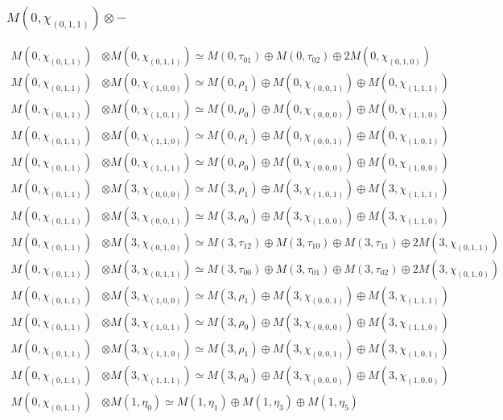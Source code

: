 \subsubsection{$ M(0,\chi_{(0,1,1)})\otimes -$}
\begin{align*}
M(0,\chi_{(0,1,1)}) &\otimes M(0,\chi_{(0,1,1)}) \simeq M(0,\tau_{01}) \oplus M(0,\tau_{02}) \oplus 2 M(0,\chi_{(0,1,0)}) \\
M(0,\chi_{(0,1,1)}) &\otimes M(0,\chi_{(1,0,0)}) \simeq M(0,\rho_{1}) \oplus M(0,\chi_{(0,0,1)}) \oplus M(0,\chi_{(1,1,1)}) \\
M(0,\chi_{(0,1,1)}) &\otimes M(0,\chi_{(1,0,1)}) \simeq M(0,\rho_{0}) \oplus M(0,\chi_{(0,0,0)}) \oplus M(0,\chi_{(1,1,0)}) \\
M(0,\chi_{(0,1,1)}) &\otimes M(0,\chi_{(1,1,0)}) \simeq M(0,\rho_{1}) \oplus M(0,\chi_{(0,0,1)}) \oplus M(0,\chi_{(1,0,1)}) \\
M(0,\chi_{(0,1,1)}) &\otimes M(0,\chi_{(1,1,1)}) \simeq M(0,\rho_{0}) \oplus M(0,\chi_{(0,0,0)}) \oplus M(0,\chi_{(1,0,0)}) \\
M(0,\chi_{(0,1,1)}) &\otimes M(3,\chi_{(0,0,0)}) \simeq M(3,\rho_{1}) \oplus M(3,\chi_{(1,0,1)}) \oplus M(3,\chi_{(1,1,1)}) \\
M(0,\chi_{(0,1,1)}) &\otimes M(3,\chi_{(0,0,1)}) \simeq M(3,\rho_{0}) \oplus M(3,\chi_{(1,0,0)}) \oplus M(3,\chi_{(1,1,0)}) \\
M(0,\chi_{(0,1,1)}) &\otimes M(3,\chi_{(0,1,0)}) \simeq M(3,\tau_{12}) \oplus M(3,\tau_{10}) \oplus M(3,\tau_{11}) \oplus 2 M(3,\chi_{(0,1,1)}) \\
M(0,\chi_{(0,1,1)}) &\otimes M(3,\chi_{(0,1,1)}) \simeq M(3,\tau_{00}) \oplus M(3,\tau_{01}) \oplus M(3,\tau_{02}) \oplus 2 M(3,\chi_{(0,1,0)}) \\
M(0,\chi_{(0,1,1)}) &\otimes M(3,\chi_{(1,0,0)}) \simeq M(3,\rho_{1}) \oplus M(3,\chi_{(0,0,1)}) \oplus M(3,\chi_{(1,1,1)}) \\
M(0,\chi_{(0,1,1)}) &\otimes M(3,\chi_{(1,0,1)}) \simeq M(3,\rho_{0}) \oplus M(3,\chi_{(0,0,0)}) \oplus M(3,\chi_{(1,1,0)}) \\
M(0,\chi_{(0,1,1)}) &\otimes M(3,\chi_{(1,1,0)}) \simeq M(3,\rho_{1}) \oplus M(3,\chi_{(0,0,1)}) \oplus M(3,\chi_{(1,0,1)}) \\
M(0,\chi_{(0,1,1)}) &\otimes M(3,\chi_{(1,1,1)}) \simeq M(3,\rho_{0}) \oplus M(3,\chi_{(0,0,0)}) \oplus M(3,\chi_{(1,0,0)}) \\
M(0,\chi_{(0,1,1)}) &\otimes M(1,\eta_{0}) \simeq M(1,\eta_{1}) \oplus M(1,\eta_{3}) \oplus M(1,\eta_{5}) \\

\end{align*}
